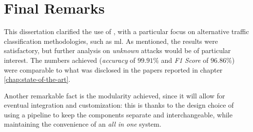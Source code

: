 \section{Final Remarks}
\label{sec:final-remarks}

This dissertation clarified the use of , with a particular focus on alternative traffic classification methodologies, such as \gls{ml}. As mentioned, the results were satisfactory, but further analysis on \textit{unknown} attacks would be of particular interest. The numbers achieved (\textit{accuracy} of $99.91\%$ and \textit{F1 Score} of $96.86\%$) were comparable to what was disclosed in the papers reported in chapter \ref{chap:state-of-the-art}.
\par Another remarkable fact is the modularity achieved, since it will allow for eventual integration and customization: this is thanks to the design choice of using a pipeline to keep the components separate and 
interchangeable, while maintaining the convenience of an \textit{all in one} system.